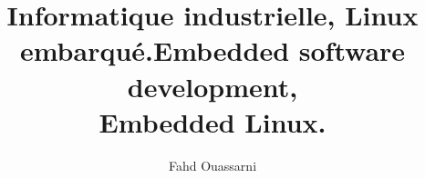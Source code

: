 
\author{Fahd Ouassarni}

\ifdefined\iscv
\title{Informatique industrielle, Linux embarqué.}
\else\fi

\ifdefined\isresume
\title{Embedded software development,\\ Embedded Linux.}
\else\fi

\address{6 Boulevard Mar\'echal Juin\\
         14000 CAEN}

\maketitle
